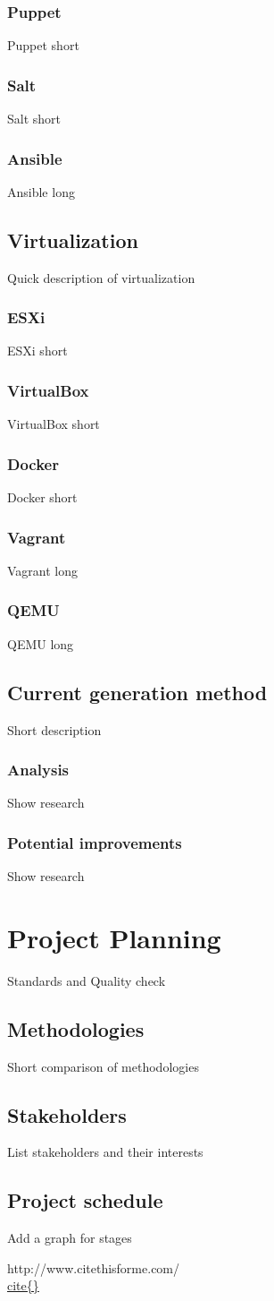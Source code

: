\documentclass[12pt,a4paper]{report}
\begin{document}
\subsection{Puppet}
Puppet short
\subsection{Salt}
Salt short
\subsection{Ansible}
Ansible long
\section{Virtualization}
Quick description of virtualization
\subsection{ESXi}
ESXi short
\subsection{VirtualBox}
VirtualBox short
\subsection{Docker}
Docker short
\subsection{Vagrant}
Vagrant long
\subsection{QEMU}
QEMU long
\section{Current generation method}
Short description
\subsection{Analysis}
Show research
\subsection{Potential improvements}
Show research

\chapter{Project Planning}
Standards and Quality check
\section{Methodologies}
Short comparison of methodologies
\section{Stakeholders}
List stakeholders and their interests
\section{Project schedule}
Add a graph for stages

\begin{thebibliography}{9}
 http://www.citethisforme.com/
\\\url{ cite{}}


\end{thebibliography}
\end{document}
